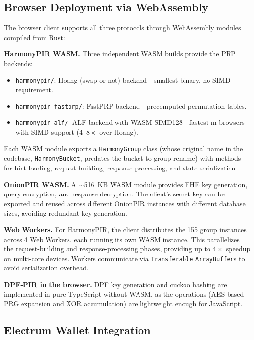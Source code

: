 \subsection{Browser Deployment via WebAssembly}

The browser client supports all three protocols through WebAssembly \cite{wasm} modules compiled from Rust:

\textbf{HarmonyPIR WASM.} Three independent WASM builds provide the PRP backends:
\begin{itemize}[nolistsep,leftmargin=*]
    \item \texttt{harmonypir/}: Hoang (swap-or-not) backend---smallest binary, no SIMD requirement.
    \item \texttt{harmonypir-fastprp/}: FastPRP backend---precomputed permutation tables.
    \item \texttt{harmonypir-alf/}: ALF backend with WASM SIMD128---fastest in browsers with SIMD support ($4$--$8\times$ over Hoang).
\end{itemize}

Each WASM module exports a \texttt{HarmonyGroup} class (whose original name in the codebase, \texttt{HarmonyBucket}, predates the bucket-to-group rename) with methods for hint loading, request building, response processing, and state serialization.

\textbf{OnionPIR WASM.} A $\sim$516~KB WASM module provides FHE key generation, query encryption, and response decryption. The client's secret key can be exported and reused across different OnionPIR instances with different database sizes, avoiding redundant key generation.

\textbf{Web Workers.} For HarmonyPIR, the client distributes the 155 group instances across 4 Web Workers, each running its own WASM instance. This parallelizes the request-building and response-processing phases, providing up to $4\times$ speedup on multi-core devices. Workers communicate via \texttt{Transferable} \texttt{ArrayBuffer}s to avoid serialization overhead.

\textbf{DPF-PIR in the browser.} DPF key generation and cuckoo hashing are implemented in pure TypeScript without WASM, as the operations (AES-based PRG expansion and XOR accumulation) are lightweight enough for JavaScript.

\subsection{Electrum Wallet Integration}

